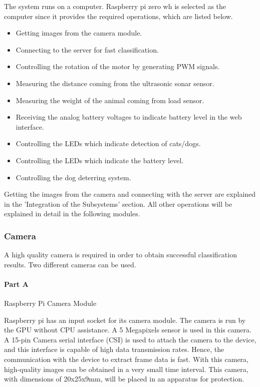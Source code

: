  The system runs on a computer. Raspberry pi zero wh is selected as the computer since it provides the required operations, which are listed below. 
 
\begin{itemize}
\item Getting images from the camera module.
\item Connecting to the server for fast classification.
\item Controlling the rotation of the motor by generating PWM signals.
\item Measuring the distance coming from the ultrasonic sonar sensor.
\item Measuring the weight of the animal coming from load sensor.
\item Receiving the analog battery voltages to indicate battery level in the web interface.
\item Controlling the LEDs which indicate detection of cats/dogs.
\item Controlling the LEDs which indicate the battery level.
\item Controlling the dog deterring system.
\end{itemize}
 
 
 Getting the images from the camera and connecting with the server are explained in the 'Integration of the Subsystems' section. All other operations will be explained in detail in the following modules.
 
  \subsubsection{Camera}
  
  A high quality camera is required in order to obtain successful classification results. Two different cameras can be used.
 
 \paragraph{Part A} Raspberry Pi Camera Module
 
 Raspberry pi has an input socket for its camera module. The camera is run by the GPU without CPU assistance. A 5 Megapixels sensor is used in this camera. A 15-pin Camera serial interface (CSI) is used to attach the camera to the device, and this interface is capable of high data transmission rates. Hence, the communication with the device to extract frame data is fast. With this camera, high-quality images can be obtained in a very small time interval. This camera, with dimensions of 20x25x9mm, will be placed in an apparatus for protection.
 

